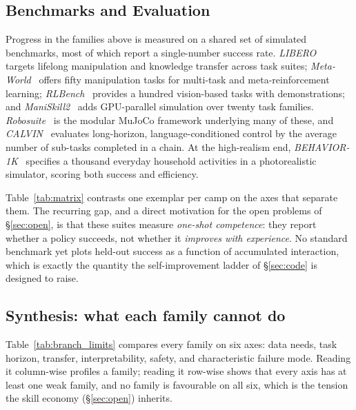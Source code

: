 \subsection{Benchmarks and Evaluation}
\label{sec:bench}

Progress in the families above is measured on a shared set of simulated benchmarks, most of
which report a single-number success rate. \emph{LIBERO}~\citep{libero} targets lifelong
manipulation and knowledge transfer across task suites; \emph{Meta-World}~\citep{metaworld}
offers fifty manipulation tasks for multi-task and meta-reinforcement learning;
\emph{RLBench}~\citep{rlbench} provides a hundred vision-based tasks with demonstrations; and
\emph{ManiSkill2}~\citep{maniskill2} adds GPU-parallel simulation over twenty task families.
\emph{Robosuite}~\citep{robosuite} is the modular MuJoCo framework underlying many of these,
and \emph{CALVIN}~\citep{calvin} evaluates long-horizon, language-conditioned control by the
average number of sub-tasks completed in a chain. At the high-realism end,
\emph{BEHAVIOR-1K}~\citep{behavior1k} specifies a thousand everyday household activities in a
photorealistic simulator, scoring both success and efficiency.

Table~\ref{tab:matrix} contrasts one exemplar per camp on the axes that separate them. The
recurring gap, and a direct motivation for the open problems of \S\ref{sec:open}, is that
these suites measure \emph{one-shot competence}: they report whether a policy succeeds, not
whether it \emph{improves with experience}. No standard benchmark yet plots held-out success as
a function of accumulated interaction, which is exactly the quantity the self-improvement ladder
of \S\ref{sec:code} is designed to raise.



\subsection{Synthesis: what each family cannot do}
\label{sec:synthesis}
Table~\ref{tab:branch_limits} compares every family on six axes: data needs, task horizon,
transfer, interpretability, safety, and characteristic failure mode. Reading it column-wise
profiles a family; reading it row-wise shows that every axis has at least one weak family, and
no family is favourable on all six, which is the tension the skill economy (\S\ref{sec:open})
inherits.


